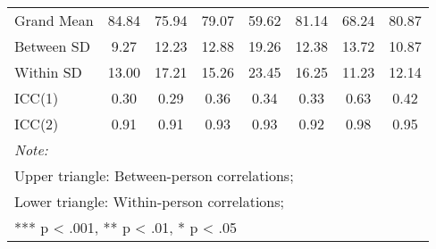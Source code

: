 \begin{table}
\begin{minipage}[t][\textheight][t]{\textwidth}
{\begin{tabular}[t]{lccccccc}
\addlinespace
\hspace{1em}Grand Mean & 84.84 & 75.94 & 79.07 & 59.62 & 81.14 & 68.24 & 80.87\\
\hspace{1em}Between SD & 9.27 & 12.23 & 12.88 & 19.26 & 12.38 & 13.72 & 10.87\\
\hspace{1em}Within SD & 13.00 & 17.21 & 15.26 & 23.45 & 16.25 & 11.23 & 12.14\\
\hspace{1em}ICC(1) & 0.30 & 0.29 & 0.36 & 0.34 & 0.33 & 0.63 & 0.42\\
\hspace{1em}ICC(2) & 0.91 & 0.91 & 0.93 & 0.93 & 0.92 & 0.98 & 0.95\\
\bottomrule
\multicolumn{8}{l}{\rule{0pt}{1em}\textit{Note: }}\\
\multicolumn{8}{l}{\rule{0pt}{1em}Upper triangle: Between-person correlations;}\\
\multicolumn{8}{l}{\rule{0pt}{1em}Lower triangle: Within-person correlations;}\\
\multicolumn{8}{l}{\rule{0pt}{1em}*** p < .001, ** p < .01,  * p < .05}\\
\end{tabular}}
\end{minipage}
\end{table}
